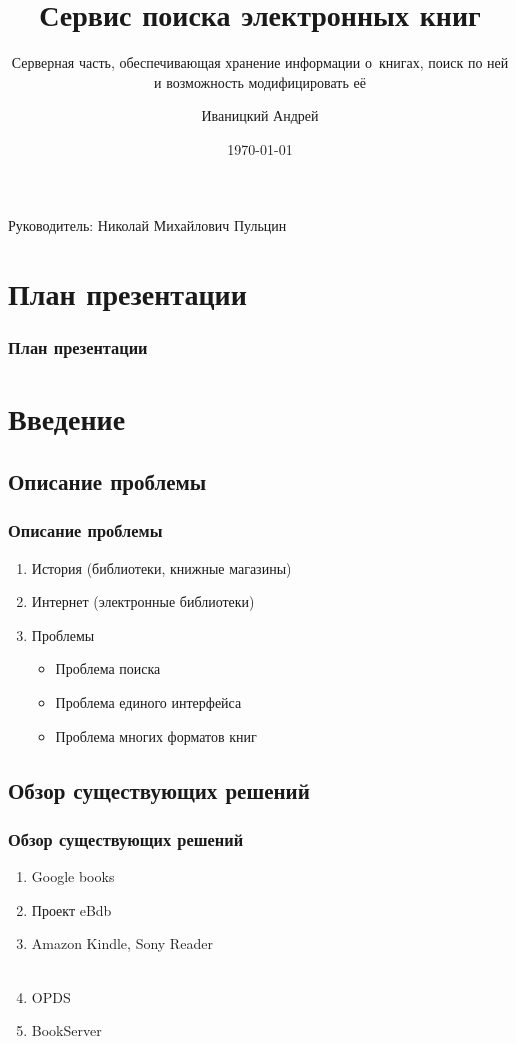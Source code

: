 \documentclass[utf8,handout]{beamer}
\title{Сервис поиска электронных книг}
\subtitle{Серверная часть, обеспечивающая хранение информации о~книгах, поиск по ней и возможность модифицировать её}
\author{Иваницкий Андрей}
\institute{Санкт-Петербургский Академический Университет РАН}
\date{\today}
\begin{document}
\begin{frame}
	\titlepage
	\begin{flushright}
    Руководитель: Николай Михайлович Пульцин

  \end{flushright}
\end{frame}

\section*{План презентации}
	\begin{frame}
		\frametitle{План презентации}
		\tableofcontents[pausesections]
	\end{frame}

\section{Введение}
\subsection{Описание проблемы}
  \begin{frame}

    \frametitle{Описание проблемы}
    \begin{enumerate}
      \item История (библиотеки, книжные магазины)
      \item Интернет (электронные библиотеки)
      \item Проблемы
	      \begin{itemize}
		    \item Проблема поиска
            \item Проблема единого интерфейса
            \item Проблема многих форматов книг
	      \end{itemize}
      \end{enumerate}
  \end{frame}

\subsection{Обзор существующих решений}
  \begin{frame}
    \frametitle{Обзор существующих решений}

    \begin{enumerate}
      \item Google books
      \item Проект eBdb
      \item Amazon Kindle, Sony Reader \\
			~
      \item OPDS
      \item BookServer
    \end{enumerate}
  \end{frame}
\end{document}
